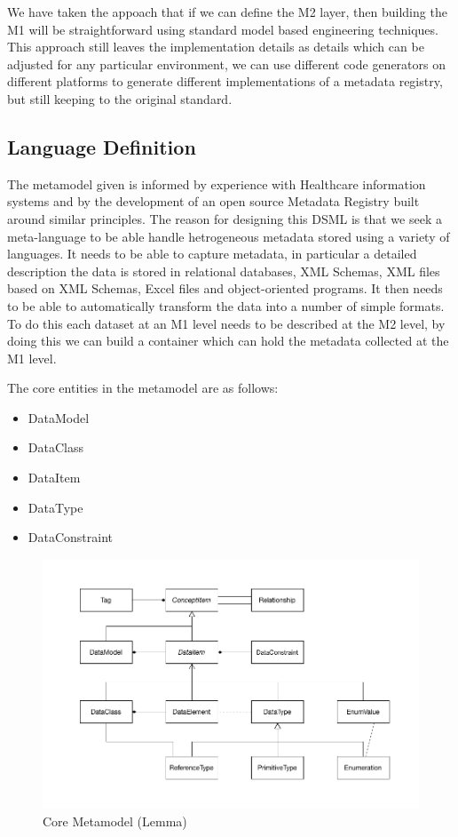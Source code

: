 \documentclass{llncs}
\begin{document}
We have taken the appoach that if we can define the M2 layer, then building the M1 will be straightforward using standard model based engineering techniques. This approach still leaves the implementation details as details which can be adjusted for any particular environment, we can use different code generators on different platforms to generate different implementations of a metadata registry, but still keeping to the original standard.


\subsection{Language Definition}

The metamodel given is informed by experience with Healthcare information systems \cite{DSMCR} and by the development of an open source Metadata Registry built around similar principles. The reason for designing this DSML  is that we seek a meta-language to be able handle hetrogeneous metadata stored using a variety of languages. It needs to be able to capture metadata, in particular a detailed description the data is stored in relational databases, XML Schemas, XML files based on XML Schemas, Excel files and object-oriented programs. It then needs to be able to automatically transform the data into a number of simple formats. To do this each dataset at an M1 level needs to be described at the M2 level, by doing this we can build a container which can hold the metadata collected at the M1 level.

The core entities in the metamodel are as follows:
\begin{itemize}
\item DataModel
\item DataClass
\item DataItem
\item DataType
\item DataConstraint
\end{itemize}

\begin{figure}[h]
\includegraphics[width=1.0\textwidth,natwidth=610,natheight=642]{LemmaCore1}
\caption{Core Metamodel (Lemma)} 
\label{fig:lemma}
\end{figure}
\end{document}
